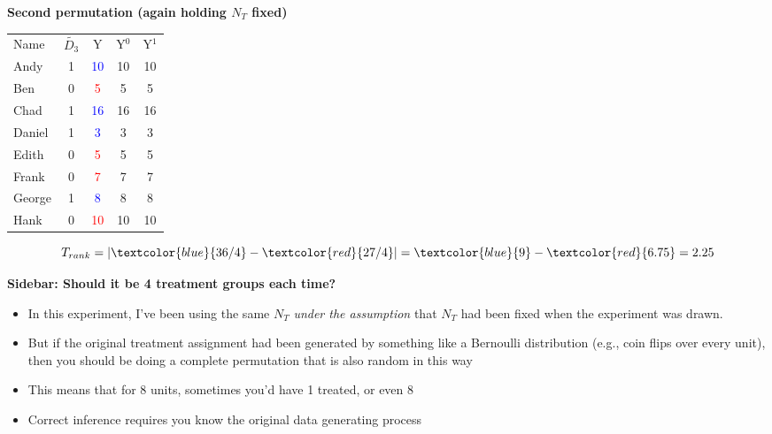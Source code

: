 \documentclass[notes=show]{beamer}
\begin{document}
\begin{frame}[plain]

\begin{center}
\textbf{Second permutation (again holding $N_T$ fixed)}
\end{center}

\begin{table}[htbp]\centering
\begin{center}
\begin{threeparttable}
\begin{tabular}{lcccc}
\toprule
\multicolumn{1}{l}{Name}&
\multicolumn{1}{c}{$\tilde{D_3}$}&
\multicolumn{1}{c}{Y}&
\multicolumn{1}{c}{Y$^0$}&
\multicolumn{1}{c}{Y$^1$}\\
Andy		& 1 & \textcolor{blue}{10}  & {10} & 10 \\
Ben		& 0 & \textcolor{red}{5}    & {5} & 5 \\
Chad	& 1 & \textcolor{blue}{16}  & {16} & 16 \\	
Daniel	& 1 &  \textcolor{blue}{3}   & {3} & 3 \\
Edith		& 0 & \textcolor{red}{5}    & 5 & {5} \\
Frank	& 0 & \textcolor{red}{7}    & 7& {7}  \\
George	& 1 & \textcolor{blue}{8}    & 8 & {8} \\
Hank		& 0 & \textcolor{red}{10}  & 10 & {10} \\
\bottomrule
\end{tabular}
\end{threeparttable}
\end{center}
\end{table}

$$T_{rank} =  | \textcolor{blue}{36/4} - \textcolor{red}{27/4}  | = \textcolor{blue}{9} - \textcolor{red}{6.75} = 2.25$$
	
\end{frame}

\begin{frame}[plain]
\begin{center}
\textbf{Sidebar: Should it be 4 treatment groups each time?}
\end{center}

\begin{itemize}
\item In this experiment, I've been using the same $N_T$ \emph{under the assumption} that $N_T$ had been fixed when the experiment was drawn.
\item But if the original treatment assignment had been generated by something like a Bernoulli distribution (e.g., coin flips over every unit), then you should be doing a complete permutation that is also random in this way
\item This means that for 8 units, sometimes you'd have 1 treated, or even 8
\item Correct inference requires you know the original data generating process
\end{itemize}

\end{frame}
\end{document}
